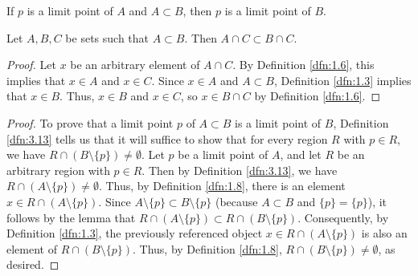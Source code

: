 \documentclass[../main.tex]{subfiles}
\begin{document}
\begin{theorem}\label{trm:3.14}
    If $p$ is a limit point of $A$ and $A\subset B$, then $p$ is a limit point of $B$.
    \begin{lemma*}
        Let $A,B,C$ be sets such that $A\subset B$. Then $A\cap C\subset B\cap C$.
        \begin{proof}
            Let $x$ be an arbitrary element of $A\cap C$. By Definition \ref{dfn:1.6}, this implies that $x\in A$ and $x\in C$. Since $x\in A$ and $A\subset B$, Definition \ref{dfn:1.3} implies that $x\in B$. Thus, $x\in B$ and $x\in C$, so $x\in B\cap C$ by Definition \ref{dfn:1.6}.
        \end{proof}
    \end{lemma*}
    \begin{proof}
        To prove that a limit point $p$ of $A\subset B$ is a limit point of $B$, Definition \ref{dfn:3.13} tells us that it will suffice to show that for every region $R$ with $p\in R$, we have $R\cap(B\setminus\{p\})\neq\emptyset$. Let $p$ be a limit point of $A$, and let $R$ be an arbitrary region with $p\in R$. Then by Definition \ref{dfn:3.13}, we have $R\cap(A\setminus\{p\})\neq\emptyset$. Thus, by Definition \ref{dfn:1.8}, there is an element $x\in R\cap(A\setminus\{p\})$. Since $A\setminus\{p\}\subset B\setminus\{p\}$ (because $A\subset B$ and $\{p\}=\{p\}$), it follows by the lemma that $R\cap(A\setminus\{p\})\subset R\cap(B\setminus\{p\})$. Consequently, by Definition \ref{dfn:1.3}, the previously referenced object $x\in R\cap(A\setminus\{p\})$ is also an element of $R\cap(B\setminus\{p\})$. Thus, by Definition \ref{dfn:1.8}, $R\cap(B\setminus\{p\})\neq\emptyset$, as desired.
    \end{proof}
\end{theorem}
\end{document}

